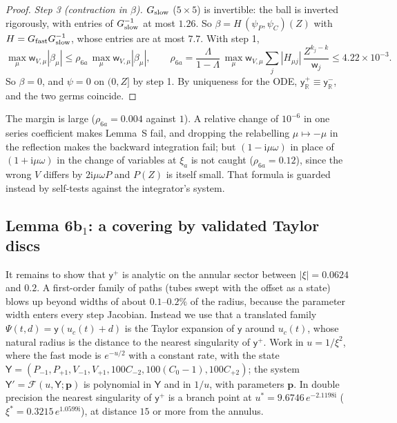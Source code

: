 \documentclass{amsart}
\numberwithin{equation}{section}
\theoremstyle{plain}
\theoremstyle{definition}
\theoremstyle{remark}
\newcommand{\iu}{\mathrm{i}}
\begin{document}
\begin{proof}
\emph{Step 3 (contraction in $\beta$).} $G_{\rm slow}$ ($5\times5$) is invertible: the ball is inverted rigorously, with entries of
$G_{\rm slow}^{-1}$ at most $1.26$. So $\beta = H\,(\psi_P, \psi_C)(Z)$ with $H = G_{\rm fast}G_{\rm slow}^{-1}$, whose entries are at most
$7.7$. With step 1,
\[
\max_\mu\mathsf w_{V,\mu}|\beta_\mu| \le \rho_{6a}\,\max_\mu\mathsf w_{V,\mu}|\beta_\mu|, \qquad
\rho_{6a} = \frac{\Lambda}{1-\Lambda}\,\max_\mu\mathsf w_{V,\mu}\sum_j|H_{\mu j}|\,\frac{Z^{k_j-k}}{\mathsf w_j} \le 4.22\times10^{-3} .
\]
So $\beta = 0$, and $\psi = 0$ on $(0, Z]$ by step 1. By uniqueness for the ODE, $\mathsf y^+_{\mathbb R} \equiv \mathsf y^-_{\mathbb R}$, and the two
germs coincide.
\end{proof}

The margin is large ($\rho_{6a} = 0.004$ against $1$). A relative change of $10^{-6}$ in one series coefficient makes Lemma~S fail, and
dropping the relabelling $\mu \mapsto -\mu$ in the reflection makes the backward integration fail; but $(1 - \iu\mu\omega)$ in place of
$(1 + \iu\mu\omega)$ in the change of variables at $\xi_a$ is not caught ($\rho_{6a} = 0.12$), since the wrong $V$ differs by
$2\iu\mu\omega P$ and $P(Z)$ is itself small. That formula is guarded instead by self-tests against the integrator's system.

\subsection{Lemma 6b\texorpdfstring{$_1$}{1}: a covering by validated Taylor discs}
It remains to show that $\mathsf y^+$ is analytic on the annular sector between $|\xi| = 0.0624$ and $0.2$. A first-order family
of paths (tubes swept with the offset as a state) blows up beyond widths of about $0.1$--$0.2\%$ of the radius, because the
parameter width enters every step Jacobian. Instead we use that a translated family $\Psi(t, d) = \mathsf y(u_c(t) + d)$ is the Taylor
expansion of $\mathsf y$ around $u_c(t)$, whose natural radius is the distance to the nearest singularity of $\mathsf y^+$. Work in
$u = 1/\xi^2$, where the fast mode is $e^{-u/2}$ with a constant rate, with the state
$\mathsf Y = (P_{-1}, P_{+1}, V_{-1}, V_{+1}, 100C_{-2}, 100(C_0 - 1), 100C_{+2})$; the system $\mathsf Y' = \mathcal F(u, \mathsf Y; \mathbf p)$ is polynomial
in $\mathsf Y$ and in $1/u$, with parameters $\mathbf p$. In double precision the nearest singularity of $\mathsf y^+$ is a branch point at
$u^* = 9.6746\,e^{-2.1198\iu}$ ($\xi^* = 0.3215\,e^{1.0599\iu}$), at distance $15$ or more from the annulus.
\end{document}
